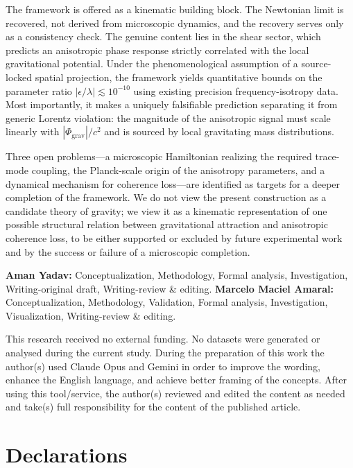 \documentclass[pdflatex,sn-mathphys-num]{sn-jnl}%
\theoremstyle{thmstyleone}%
\theoremstyle{thmstyletwo}%
\theoremstyle{thmstylethree}%
\begin{document}
The framework is offered as a kinematic building block. The
Newtonian limit is recovered, not derived from microscopic
dynamics, and the recovery serves only as a consistency check.
The genuine content lies in the shear sector, which predicts
an anisotropic phase response strictly correlated with the local 
gravitational potential. Under the phenomenological assumption 
of a source-locked spatial projection, the framework yields 
quantitative bounds on the parameter ratio 
$|\epsilon/\lambda| \lesssim 10^{-10}$ using existing precision 
frequency-isotropy data. Most importantly, it makes a uniquely 
falsifiable prediction separating it from generic Lorentz 
violation: the magnitude of the anisotropic signal must scale 
linearly with $|\Phi_{\mathrm{grav}}|/c^2$ and is sourced by 
local gravitating mass distributions.

Three open problems---a microscopic Hamiltonian realizing the
required trace-mode coupling, the Planck-scale origin of the
anisotropy parameters, and a dynamical mechanism for coherence
loss---are identified as targets for a deeper completion of the
framework. We do not view the present construction as a
candidate theory of gravity; we view it as a kinematic
representation of one possible structural relation between
gravitational attraction and anisotropic coherence loss, to be
either supported or excluded by future experimental work and by
the success or failure of a microscopic completion.

\backmatter

\textbf{Aman Yadav:} Conceptualization, Methodology, Formal analysis, Investigation, Writing-original draft, Writing-review \& editing. \textbf{Marcelo Maciel Amaral:} Conceptualization, Methodology, Validation, Formal analysis, Investigation, Visualization, Writing-review \& editing.

 This research received no external funding.
 No datasets were generated or analysed during the current study.
 During the preparation of this work the author(s) used
Claude Opus and Gemini in order to improve the wording,
enhance the English language, and achieve better framing
of the concepts. After using this tool/service, the author(s)
reviewed and edited the content as needed and take(s) full
responsibility for the content of the published article.
\section*{Declarations}
\end{document}
